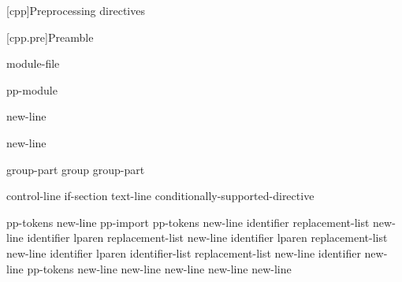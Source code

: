 [cpp]{Preprocessing directives}%

%
%


[cpp.pre]{Preamble}

\begin{bnf}
\br
    \br
    module-file
\end{bnf}

\begin{bnf}
\br
     pp-module  
\end{bnf}

\begin{bnf}
\br
     \terminal{;} new-line 
\end{bnf}

\begin{bnf}
\br
     \terminal{:}  \terminal{;} new-line 
\end{bnf}

\begin{bnf}
\br
    group-part\br
    group group-part
\end{bnf}

\begin{bnf}
\br
    control-line\br
    if-section\br
    text-line\br
    \terminal{\#} conditionally-supported-directive
\end{bnf}

\begin{bnf}
\br
     pp-tokens new-line\br
    pp-import\br
     pp-tokens new-line\br
     identifier replacement-list new-line\br
     identifier lparen  \terminal{)} replacement-list new-line\br
     identifier lparen  replacement-list new-line\br
     identifier lparen identifier-list  replacement-list new-line\br
     identifier new-line\br
     pp-tokens new-line\br
      new-line\br
      new-line\br
      new-line\br
    \terminal{\# }new-line
\end{bnf}

